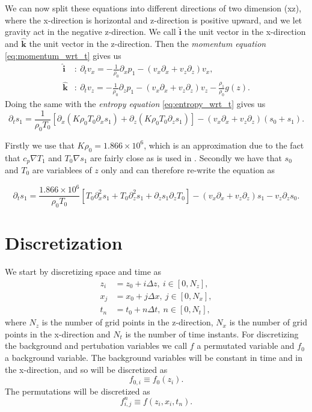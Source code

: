 \documentclass{article}
\begin{document}
We can now split these equations into different directions of two dimension (xz), where the x-direction is horizontal and z-direction is positive upward, and we let gravity act in the negative z-direction. We call $\mathbf{\hat{i}}$ the unit vector in the x-direction and $\mathbf{\hat{k}}$ the unit vector in the z-direction. Then the \textit{momentum equation} \ref{eq:momentum_wrt_t} gives us
\begin{align}
    \mathbf{\hat{i}}&:\ \partial_t v_x = -\frac{1}{\rho_0}\partial_x p_1 - (v_x\partial_x + v_z\partial_z)v_x, \label{eq:momentum_wrt_i}\\
    \mathbf{\hat{k}}&:\ \partial_t v_z = -\frac{1}{\rho_0}\partial_z p_1 - (v_x\partial_x + v_z\partial_z)v_z - \frac{\rho_1}{\rho_0}g(z). \label{eq:momentum_wrt_k}
\end{align}
Doing the same with the \textit{entropy equation} \ref{eq:entropy_wrt_t} gives us
\begin{equation*}
    \partial_t s_1 = \frac{1}{\rho_0 T_0}\left[ \partial_x (K\rho_0T_0\partial_xs_1) + \partial_z (K\rho_0T_0\partial_z s_1)\right] - (v_x\partial_x+v_z\partial_z)(s_0+s_1).
\end{equation*}

Firstly we use that $K\rho_0=1.866\times10^6$, which is an approximation due to the fact that $c_p \nabla T_1$ and $T_0 \nabla s_1$ are fairly close as is used in \citep{1999ApJS..121..247L}. Secondly we have that $s_0$ and $T_0$ are variablees of $z$ only and can therefore re-write the equation as

\begin{equation}
    \partial_t s_1 = \frac{1.866\times10^6}{\rho_0 T_0}\left[ T_0\partial^2_x s_1 + T_0\partial_z^2s_1 +\partial_z s_1 \partial_z T_0 \right] - (v_x\partial_x+v_z\partial_z)s_1 - v_z\partial_z s_0.
\end{equation}

\section{Discretization}
We start by discretizing space and time as
\begin{align}
    z_i &= z_0 + i\Delta z,\ i\in[0,N_z], \\ 
    x_j &= x_0 + j\Delta x,\ j\in[0,N_x],\\ 
    t_n &= t_0 + n\Delta t,\ n\in[0,N_t],
\end{align}
where $N_z$ is the number of grid points in the z-direction, $N_x$ is the number of grid points in the x-direction and $N_t$ is the number of time instants. For discretizing the background and pertubation variables we call $f$ a permutated variable and $f_0$ a background variable. The background variables will be constant in time and in the x-direction, and so will be discretized as
\begin{equation}
    f_{0,i}\equiv f_0(z_i).
\end{equation}
The permutations will be discretized as
\begin{equation}
    f_{i,j}^{n}\equiv f(z_i, x_i, t_n).
\end{equation}
\end{document}
